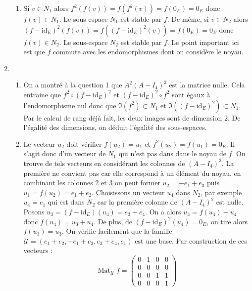 \begin{enumerate}
\begin{enumerate}
 \item Si $v\in N_1$ alors $f^2(f(v))=f(f^2(v))=f(0_E)=0_E$ donc $f(v)\in N_1$. Le sous-espace $N_1$ est stable par $f$. \newline
De même, si $v\in N_2$ alors $(f-\mathrm{id}_E)^2(f(v))=f((f-\mathrm{id}_E)^2(v))=f(0_E)=0_E$ donc $f(v)\in N_2$. Le sous-espace $N_2$ est stable par $f$. Le point important ici est que $f$ commute avec les endomorphismes dont on considère le noyau.
\end{enumerate}

 \item
\begin{enumerate}
 \item On a montré à la question 1 que $A^2(A-I_4)^2$ est la matrice nulle. Cela entraine que $f^2\circ (f-\mathrm{id}_E)^2$ et  $(f-\mathrm{id}_E)^2\circ f^2$ sont égaux à l'endomorphisme nul donc que $\Im (f^2)\subset N_1$ et $\Im((f-\mathrm{id}_E)^2)\subset N_1$. Par le calcul de rang déjà fait, les deux images sont de dimension $2$. De l'égalité des dimensions, on déduit l'égalité des sous-espaces.  
 \item Le vecteur $u_2$ doit vérifier $f(u_2)=u_1$ et $f^2(u_2)=f(u_1)=0_E$. Il s'agit donc d'un vecteur de $N_1$ qui n'est pas dans dans le noyau de $f$. On trouve de tels vecteurs en considérant les colonnes de $(A-I_4)^2$. La première ne convient pas car elle correspond à un élément du noyau, en combinant les colonnes 2 et 3 on peut former $u_2=-e_1+e_3$ puis $u_1=f(u_2)=e_1+e_2$.\newline
Choisissons un vecteur $u_4$ dans $N_2$, par exemple $u_4=e_1$ qui est dans $N_2$ car la première colonne de $(A-I_4)^2$ est nulle. Posons $u_3=(f-\mathrm{id}_E)(u_4)=e_3+e_4$. On a alors $u_3 = f(u_4)-u_4$ donc $f(u_4)=u_3+u_4$. De plus, de $(f-\mathrm{id}_E)^2(u_4)=0_E$, on tire alors $f(u_3)=u_3$.\newline
On vérifie facilement que la famille $\mathcal{U}=(e_1+e_2,-e_1+e_3,e_3+e_4,e_1)$ est une base. Par construction de ces vecteurs :
\begin{displaymath}
 \mathop{\mathrm{Mat}}_{\mathcal U}f=
\begin{pmatrix}
 0&1&0&0\\0&0&0&0\\0&0&1&1\\0&0&0&1
\end{pmatrix}
\end{displaymath}

\end{enumerate}

\end{enumerate}
